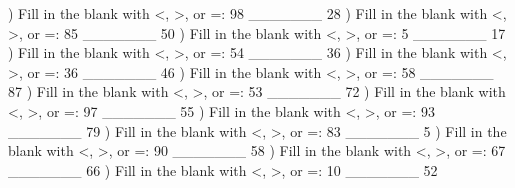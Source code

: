 \documentclass{article}%
\begin{document}
) Fill in the blank with <, >, or =: 98 \_\_\_\_\_\_\_ 28%
\newline%
\newline%
) Fill in the blank with <, >, or =: 85 \_\_\_\_\_\_\_ 50%
\newline%
\newline%
) Fill in the blank with <, >, or =: 5 \_\_\_\_\_\_\_ 17%
\newline%
\newline%
) Fill in the blank with <, >, or =: 54 \_\_\_\_\_\_\_ 36%
\newline%
\newline%
) Fill in the blank with <, >, or =: 36 \_\_\_\_\_\_\_ 46%
\newline%
\newline%
) Fill in the blank with <, >, or =: 58 \_\_\_\_\_\_\_ 87%
\newline%
\newline%
) Fill in the blank with <, >, or =: 53 \_\_\_\_\_\_\_ 72%
\newline%
\newline%
) Fill in the blank with <, >, or =: 97 \_\_\_\_\_\_\_ 55%
\newline%
\newline%
) Fill in the blank with <, >, or =: 93 \_\_\_\_\_\_\_ 79%
\newline%
\newline%
) Fill in the blank with <, >, or =: 83 \_\_\_\_\_\_\_ 5%
\newline%
\newline%
) Fill in the blank with <, >, or =: 90 \_\_\_\_\_\_\_ 58%
\newline%
\newline%
) Fill in the blank with <, >, or =: 67 \_\_\_\_\_\_\_ 66%
\newline%
\newline%
) Fill in the blank with <, >, or =: 10 \_\_\_\_\_\_\_ 52%
\end{document}
